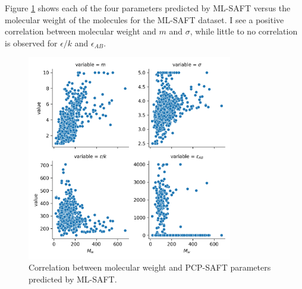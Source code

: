 



Figure \ref{fig:molecular_weight} shows each of the four parameters predicted by ML-SAFT versus the molecular weight of the molecules for the ML-SAFT dataset. I see a positive correlation between molecular weight and $m$ and $\sigma$, while little to no correlation is observed for $\epsilon/k$ and $\epsilon_{AB}$.

\begin{figure}
    \centering
    \includegraphics[width=0.8\textwidth]{gfx/Chapter08/mw_pcsaft_parameter_correlation.png}
    \caption{Correlation between molecular weight and PCP-SAFT parameters predicted by ML-SAFT.}
    \label{fig:molecular_weight}
\end{figure}

